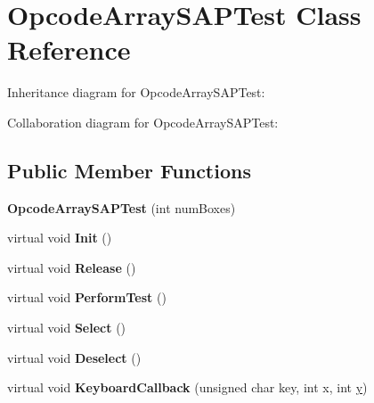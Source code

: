 \hypertarget{class_opcode_array_s_a_p_test}{\section{Opcode\+Array\+S\+A\+P\+Test Class Reference}
\label{class_opcode_array_s_a_p_test}
}


Inheritance diagram for Opcode\+Array\+S\+A\+P\+Test\+:


Collaboration diagram for Opcode\+Array\+S\+A\+P\+Test\+:
\subsection*{Public Member Functions}
\begin{DoxyCompactItemize}
\item 
\hypertarget{class_opcode_array_s_a_p_test_ad789e6a8370da9f5cb52e6bb5954f69d}{{\bfseries Opcode\+Array\+S\+A\+P\+Test} (int num\+Boxes)}\label{class_opcode_array_s_a_p_test_ad789e6a8370da9f5cb52e6bb5954f69d}

\item 
\hypertarget{class_opcode_array_s_a_p_test_a5393aabbe1c4430790329ca9c6909a52}{virtual void {\bfseries Init} ()}\label{class_opcode_array_s_a_p_test_a5393aabbe1c4430790329ca9c6909a52}

\item 
\hypertarget{class_opcode_array_s_a_p_test_acfda5eb41377d6f906115751308a9268}{virtual void {\bfseries Release} ()}\label{class_opcode_array_s_a_p_test_acfda5eb41377d6f906115751308a9268}

\item 
\hypertarget{class_opcode_array_s_a_p_test_a0b8861fbe3d09e9f8c13d5d10c8c9c6d}{virtual void {\bfseries Perform\+Test} ()}\label{class_opcode_array_s_a_p_test_a0b8861fbe3d09e9f8c13d5d10c8c9c6d}

\item 
\hypertarget{class_opcode_array_s_a_p_test_a53a88d99a9fd03c642d993d23906ec86}{virtual void {\bfseries Select} ()}\label{class_opcode_array_s_a_p_test_a53a88d99a9fd03c642d993d23906ec86}

\item 
\hypertarget{class_opcode_array_s_a_p_test_ab0d5afa3724c873507bdc3631459018b}{virtual void {\bfseries Deselect} ()}\label{class_opcode_array_s_a_p_test_ab0d5afa3724c873507bdc3631459018b}

\item 
\hypertarget{class_opcode_array_s_a_p_test_a19a3510fef430c50cb32e034b4e0f97b}{virtual void {\bfseries Keyboard\+Callback} (unsigned char key, int x, int \hyperlink{_ice_utils_8h_aa7ffaed69623192258fb8679569ff9ba}{y})}\label{class_opcode_array_s_a_p_test_a19a3510fef430c50cb32e034b4e0f97b}


\end{DoxyCompactItemize}
